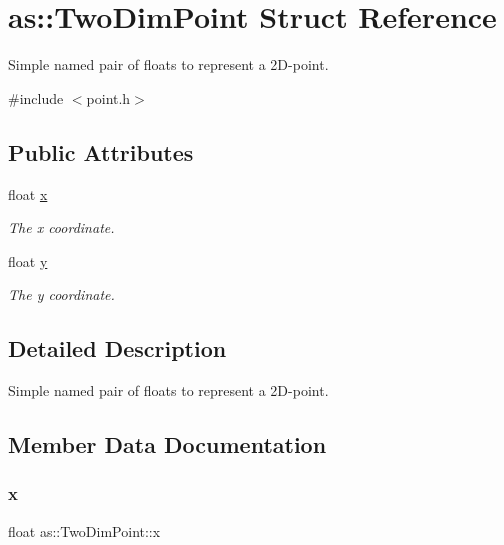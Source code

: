 \hypertarget{structas_1_1TwoDimPoint}{}\section{as\+:\+:Two\+Dim\+Point Struct Reference}
\label{structas_1_1TwoDimPoint}


Simple named pair of floats to represent a 2\+D-\/point.  




{\ttfamily \#include $<$point.\+h$>$}

\subsection*{Public Attributes}
\begin{DoxyCompactItemize}
\item 
float \hyperlink{structas_1_1TwoDimPoint_af11028c8dd15a4113e387633b0d12584}{x}
\begin{DoxyCompactList}\small\item\em The x coordinate. \end{DoxyCompactList}\item 
float \hyperlink{structas_1_1TwoDimPoint_a257d8f52b228b0fa8ea7f1c780626037}{y}
\begin{DoxyCompactList}\small\item\em The y coordinate. \end{DoxyCompactList}\end{DoxyCompactItemize}


\subsection{Detailed Description}
Simple named pair of floats to represent a 2\+D-\/point. 

\subsection{Member Data Documentation}
\mbox{\label{structas_1_1TwoDimPoint_af11028c8dd15a4113e387633b0d12584}} 
\subsubsection{\texorpdfstring{x}{x}}
{\footnotesize\ttfamily float as\+::\+Two\+Dim\+Point\+::x}



